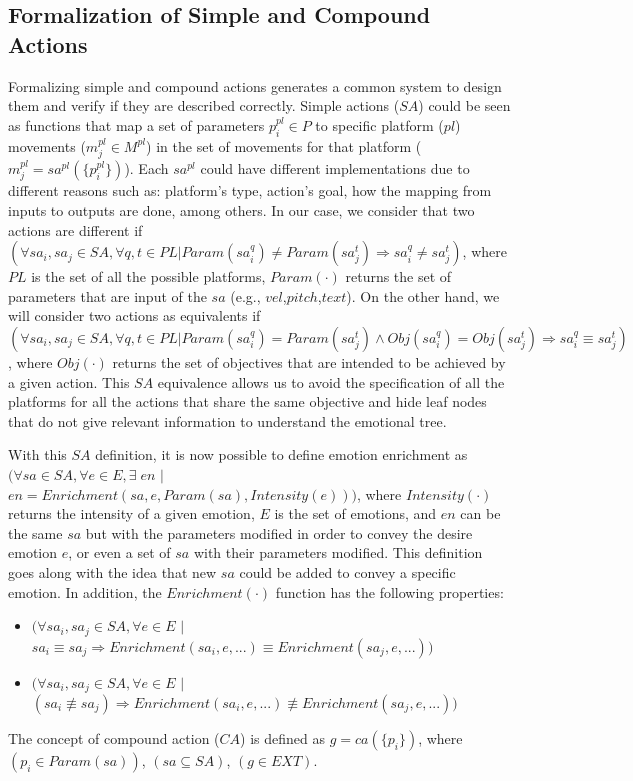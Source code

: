 \subsection{Formalization of Simple and Compound Actions}
Formalizing simple and compound actions generates a common system to design them and verify if they are described correctly. Simple actions ($SA$) could be seen as functions that map a set of parameters $p^{pl}_{i} \in P$ to specific platform ($pl$) movements ($m^{pl}_{j}\in M^{pl}$) in the set of movements for that platform ($m^{pl}_{j} =sa^{pl}(\lbrace p^{pl}_{i} \rbrace)$). Each $sa^{pl}$ could have different implementations due to different reasons such as: platform's type, action's goal, how the mapping from inputs to outputs are done, among others. 
In our case, we consider that two actions are different if $(\forall sa_{i}, sa_{j} \in SA, \forall q, t \in PL | Param( sa_{i}^q ) \neq Param( sa_{j}^t )\Rightarrow sa_{i}^q \neq sa_{j}^t)$, 
where $PL$ is the set of all the possible platforms, $Param(\cdot)$ returns the set of parameters that are input of the $sa$ (e.g., $vel$,$pitch$,$text$). 
On the other hand, we will consider two actions as equivalents if $(\forall sa_{i}, sa_{j} \in SA , \forall q, t \in PL | Param( sa_{i}^q ) = Param(sa_{j}^t ) \wedge Obj(sa_{i}^q) = Obj(sa_{j}^t) \Rightarrow sa_{i}^q \equiv sa_{j}^t)$,  
where $Obj(\cdot)$ returns the set of objectives that are intended to be achieved by a given action. This $SA$ equivalence allows us to avoid the specification of all the platforms for all the actions that share the same objective and hide leaf nodes that do not give relevant information to understand the emotional tree.

With this $SA$ definition, it is now possible to define emotion enrichment as $ (\forall sa \in SA, \forall e \in E, \exists \; en$ $|$ $en=Enrichment(sa,e,Param(sa), Intensity(e)))$, where $Intensity(\cdot)$ returns the intensity of a given emotion, $E$ is the set of emotions, and $en$ can be the same $sa$ but with the parameters modified in order to convey the desire emotion $e$, or even a set of $sa$ with their parameters modified. This definition goes along with the idea that new $sa$ could be added to convey a specific emotion.  In addition, the $Enrichment(\cdot)$ function has the following properties:
\begin{itemize}
	\item $(\forall sa_{i},sa_{j} \in SA, \forall e \in E$ $|$ $sa_{i} \equiv sa_{j} \Rightarrow Enrichment(sa_{i},e,...) \equiv Enrichment(sa_{j},e,...))$
	\item $(\forall sa_{i},sa_{j} \in SA, \forall e \in E$ $|$ $(sa_{i} \not\equiv sa_{j}) \Rightarrow Enrichment(sa_{i},e,...) \not \equiv Enrichment(sa_{j},e,...))$
\end{itemize}

The concept of compound action ($CA$) is defined as $g = ca(\{p_{i}\})$, where $(p_{i} \in Param(sa))$, $(sa \subseteq SA)$, $(g \in EXT)$.